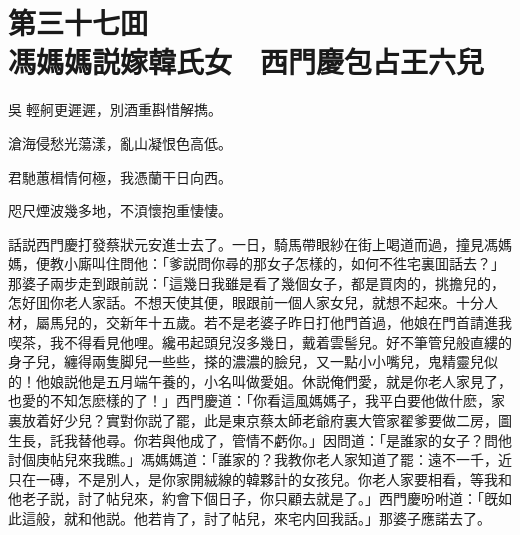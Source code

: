 
\chapter*{第三十七囬　\\馮媽媽説嫁韓氏女　西門慶包占王六兒}


\begin{myquote}
吳𦨻輕舸更遲遲，別酒重斟惜解擕。

滄海侵愁光蕩漾，亂山凝恨色高低。

君馳蕙楫情何極，我憑蘭干日向西。

咫尺煙波幾多地，不湏懷抱重悽悽。
\end{myquote}

話説西門慶打發蔡狀元安進士去了。一日，騎馬帶眼紗在街上喝道而過，撞見馮媽媽，便教小廝叫住問他：「爹説問你尋的那女子怎樣的，如何不徃宅裏囬話去？」那婆子兩步走到跟前説：「這幾日我雖是看了幾個女子，都是買肉的，挑擔兒的，怎好囬你老人家話。不想天使其便，眼跟前一個人家女兒，就想不起來。十分人材，屬馬兒的，交新年十五歲。若不是老婆子昨日打他門首過，他娘在門首請進我喫茶，我不得看見他哩。纔弔起頭兒沒多幾日，戴着雲髻兒。好不筆管兒般直縷的身子兒，纏得兩隻脚兒一些些，搽的濃濃的臉兒，又一點小小嘴兒，鬼精靈兒似的！他娘説他是五月端午養的，小名叫做愛姐。休説俺們愛，就是你老人家見了，也愛的不知怎麽樣的了！」西門慶道：「你看這風媽媽子，我平白要他做什麽，家裏放着好少兒？實對你説了罷，此是東京蔡太師老爺府裏大管家翟爹要做二房，圖生長，託我替他尋。你若與他成了，管情不虧你。」因問道：「是誰家的女子？問他討個庚帖兒來我瞧。」馮媽媽道：「誰家的？我教你老人家知道了罷：遠不一千，近只在一磚，不是別人，是你家開絨線的韓夥計的女孩兒。你老人家要相看，等我和他老子説，討了帖兒來，約會下個日子，你只顧去就是了。」西門慶吩咐道：「旣如此這般，就和他説。他若肯了，討了帖兒，來宅内回我話。」那婆子應諾去了。

